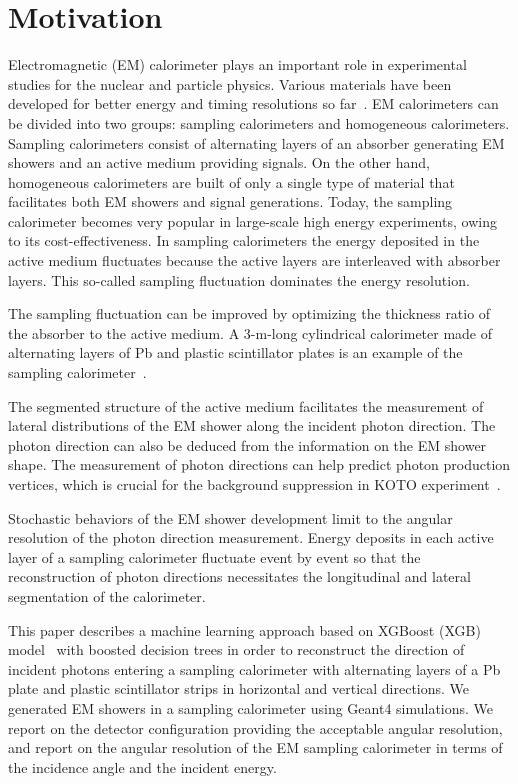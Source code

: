 \documentclass[preprint,12pt,times,a4paper]{elsarticle}
\begin{document}
\section{Motivation}
\label{sec:mot}
Electromagnetic (EM) calorimeter plays an important role in experimental studies for the nuclear and particle physics. Various materials have been developed for better energy and timing resolutions so far~\cite{Calorimeter}. EM calorimeters can be divided into two groups: sampling calorimeters and homogeneous calorimeters. Sampling calorimeters consist of alternating layers of an absorber generating EM showers and an active medium providing signals. On the other hand, homogeneous calorimeters are built of only a single type of material that facilitates both EM showers and signal generations. Today, the sampling calorimeter becomes very popular in large-scale high energy experiments, owing to its cost-effectiveness. In sampling calorimeters the energy deposited in the active medium fluctuates because the active layers are interleaved with absorber layers. This so-called sampling fluctuation dominates the energy resolution.

The sampling fluctuation can be improved by optimizing the thickness ratio of the absorber to the active medium. A 3-m-long cylindrical calorimeter made of alternating layers of Pb and plastic scintillator plates is an example of the sampling calorimeter~\cite{Murayama:2020mcp}.

The segmented structure of the active medium facilitates the measurement of lateral distributions of the EM shower along the incident photon direction. The photon direction can also be deduced from the information on the EM shower shape. The measurement of photon directions can help predict photon production vertices, which is crucial for the background suppression in KOTO experiment~\cite{KOTO:2012}.

Stochastic behaviors of the EM shower development limit to the angular resolution of the photon direction measurement. Energy deposits in each active layer of a sampling calorimeter fluctuate event by event so that the reconstruction of photon directions necessitates the longitudinal and lateral segmentation of the calorimeter.

This paper describes a machine learning approach based on XGBoost (XGB) model~\cite{xgboost:2016} with boosted decision trees in order to reconstruct the direction of incident photons entering a sampling calorimeter with alternating layers of a Pb plate and plastic scintillator strips in horizontal and vertical directions. We generated EM showers in a sampling calorimeter using Geant4 simulations. We report on the detector configuration providing the acceptable angular resolution, and report on the angular resolution of the EM sampling calorimeter in terms of the incidence angle and the incident energy.
\end{document}
